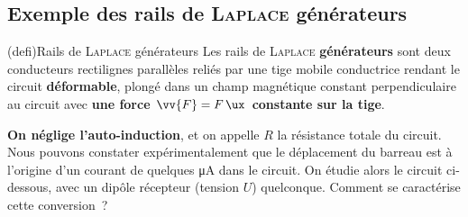 \documentclass[../../main/main.tex]{subfiles}
\begin{document}
\subsection{Exemple des rails de \textsc{Laplace} générateurs}
\label{ssec:rlplgene}
\begin{tcb*}(defi){Rails de \textsc{Laplace} générateurs}
	Les rails de \textsc{Laplace} \textbf{générateurs} sont deux conducteurs
	rectilignes parallèles reliés par une tige mobile conductrice rendant le
	circuit \textbf{déformable}, plongé dans un champ magnétique constant
	perpendiculaire au circuit avec \textbf{une force $\vv{F} = F\,\ux$
		constante sur la tige}.
\end{tcb*}
\noindent
\begin{minipage}[c]{.50\linewidth}
	\textbf{On néglige l'auto-induction}, et on appelle $R$ la résistance totale du
	circuit. Nous pouvons constater expérimentalement que le déplacement du barreau
	est à l'origine d'un courant de quelques \si{\micro A} dans le circuit. On
	étudie alors le circuit ci-dessous, avec un dipôle récepteur (tension $U$)
	quelconque. Comment se caractérise cette conversion~?
\end{minipage}
\hfill
\begin{minipage}[c]{.50\linewidth}
	\begin{center}
		\label{fig:rlplgene_schema}
	\end{center}
\end{minipage}
\end{document}
